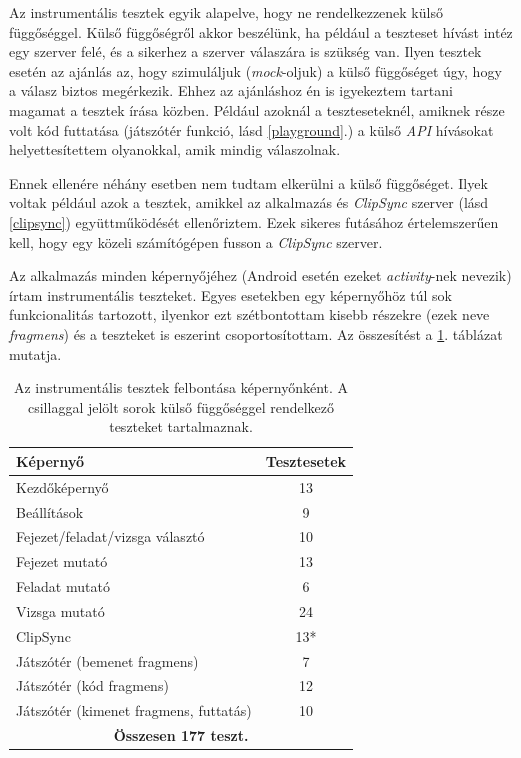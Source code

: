 \documentclass[12pt,a4paper]{article}
\begin{document}
	 Az instrumentális tesztek egyik alapelve, hogy ne rendelkezzenek külső függőséggel. Külső függőségről akkor beszélünk, ha például a teszteset hívást intéz egy szerver felé, és a sikerhez a szerver válaszára is szükség van. Ilyen tesztek esetén az ajánlás az, hogy szimuláljuk (\textit{mock}-oljuk) a külső függőséget úgy, hogy a válasz biztos megérkezik. Ehhez az ajánláshoz én is igyekeztem tartani magamat a tesztek írása közben. Például azoknál a teszteseteknél, amiknek része volt kód futtatása (játszótér funkció, lásd \ref{playground}.) a külső \textit{API} hívásokat helyettesítettem olyanokkal, amik mindig válaszolnak. 
	 
	 Ennek ellenére néhány esetben nem tudtam elkerülni a külső függőséget. Ilyek voltak például azok a tesztek, amikkel az alkalmazás és \textit{ClipSync} szerver (lásd \ref{clipsync}) együttműködését ellenőriztem. Ezek sikeres futásához értelemszerűen kell, hogy egy közeli számítógépen fusson a \textit{ClipSync} szerver.
	
	 Az alkalmazás minden képernyőjéhez (Android esetén ezeket \textit{activity}-nek nevezik) írtam instrumentális teszteket. Egyes esetekben egy képernyőhöz túl sok funkcionalitás tartozott, ilyenkor ezt szétbontottam kisebb részekre (ezek neve \textit{fragmens}) és a teszteket is eszerint csoportosítottam. Az összesítést a \ref{table_test_summary}. táblázat mutatja. 
	
	\begin{table}
		\centering
		\begin{tabular}{|l|c|}
			\hline
			\textbf{Képernyő} & \textbf{Tesztesetek} \\
			\hline
			Kezdőképernyő & 13 \\
			\hline
			Beállítások & 9 \\
			\hline
			Fejezet/feladat/vizsga választó & 10 \\
			\hline
			Fejezet mutató & 13 \\
			\hline
			Feladat mutató & 6 \\
			\hline
			Vizsga mutató & 24 \\
			\hline
			ClipSync & 13* \\
			\hline
			Játszótér (bemenet fragmens) & 7 \\
			\hline
			Játszótér (kód fragmens) & 12 \\
			\hline
			Játszótér (kimenet fragmens, futtatás) & 10 \\
			\hline
			\multicolumn{2}{|c|}{\textbf{Összesen 177 teszt.}}\\
			\hline
		\end{tabular}
		\caption{Az instrumentális tesztek felbontása képernyőnként. A csillaggal jelölt sorok külső függőséggel rendelkező teszteket tartalmaznak.}
		\label{table_test_summary}
	\end{table}
\end{document}
